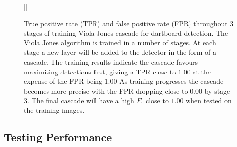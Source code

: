 \documentclass[11pt]{article}
\begin{document}
\begin{figure}[h]
[\FBwidth]
{\caption{True positive rate (TPR) and false positive rate (FPR) throughout 3 stages of training Viola-Jones cascade for dartboard detection. The Viola Jones algorithm is trained in a number of stages. At each stage a new layer will be added to the detector in the form of a cascade. The training results indicate the cascade favours maximising detections first, giving a TPR close to $1.00$ at the expense of the FPR being $1.00$ As training progresses the cascade becomes more precise with the FPR dropping close to $0.00$ by stage 3. The final cascade will have a high $F_1$ close to $1.00$ when tested on the training images.}}
{}
\label{training_tpr_fpr}
\end{figure}

\subsection{Testing Performance}

\end{document}
